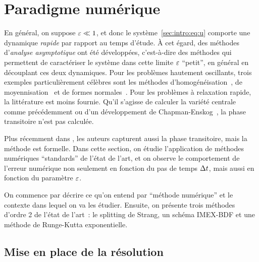 \section*{Paradigme numérique}

En général, on suppose $\varepsilon \ll 1$, et donc le système~\eqref{sec:intro:eq:u} comporte une dynamique \textit{rapide} par rapport au temps d'étude. À cet égard, des méthodes d'\textit{analyse asymptotique} ont été développées, c'est-à-dire des méthodes qui permettent de caractériser le système dans cette limite $\varepsilon$ \enquote{petit}, en général en découplant ces deux dynamiques. Pour les problèmes hautement oscillants, trois exemples particulièrement célèbres sont les méthodes d'homogénéisation~\cite{goudon.2003.homogenization}, de moyennisation~\cite{perko.1969.higher,sanders.2007.averaging,lochak.1988.multiphase} et de formes normales~\cite{murdock.2006.normal,bambusi.2003.birkhoff}. Pour les problèmes à relaxation rapide, la littérature est moins fournie. Qu'il s'agisse de calculer la variété centrale comme précédemment ou d'un développement de Chapman-Enskog~\cite{santos.1986.divergence,degond.2004.macroscopic,chartier.2015.uniformly}, la phase transitoire n'est pas calculée. 

Plus récemment dans \cite{castella.2016.formal}, les auteurs capturent
aussi la phase transitoire, mais la méthode est formelle. Dans cette
section, on étudie l'application de méthodes numériques
\enquote{standards} de l'état de l'art, et on observe le comportement de
l'erreur numérique non seulement en fonction du pas de temps $\Delta t$, mais
aussi en fonction du paramètre $\varepsilon$. 

On commence par décrire ce qu'on entend par \enquote{méthode numérique}
et le contexte dans lequel on va les étudier. Ensuite, on présente trois
méthodes d'ordre 2 de l'état de l'art~: le splitting de Strang, un
schéma IMEX-BDF et une méthode de Runge-Kutta exponentielle. 



\subsection*{Mise en place de la résolution}

